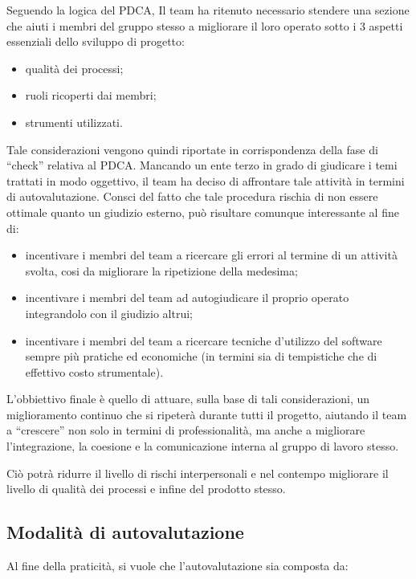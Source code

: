 Seguendo la logica del PDCA, Il team ha ritenuto necessario stendere una sezione che aiuti i membri del gruppo stesso a migliorare il loro operato sotto i 3 aspetti essenziali dello sviluppo di progetto:

\begin{itemize}
	\item qualità dei processi;
	\item ruoli ricoperti dai membri;
	\item strumenti utilizzati.
\end{itemize}

Tale considerazioni vengono quindi riportate in corrispondenza della fase di ``check'' relativa al PDCA. Mancando un ente terzo in grado di giudicare i temi trattati in modo oggettivo, il team ha deciso di affrontare tale attività in termini di autovalutazione. Consci del fatto che tale procedura rischia di non essere ottimale quanto un giudizio esterno, può risultare comunque interessante al fine di:

\begin{itemize}
	\item incentivare i membri del team a ricercare gli errori al termine di un attività svolta, cosi da migliorare la ripetizione della medesima;
	\item incentivare i membri del team ad autogiudicare il proprio operato integrandolo con il giudizio altrui;
	\item incentivare i membri del team a ricercare tecniche d'utilizzo del software sempre più pratiche ed economiche (in termini sia di tempistiche che di effettivo costo strumentale).
\end{itemize}

L'obbiettivo finale è quello di attuare, sulla base di tali considerazioni, un miglioramento continuo che si ripeterà durante tutti il progetto, aiutando il team a ``crescere'' non solo in termini di professionalità, ma anche a migliorare l'integrazione, la coesione e la comunicazione interna al gruppo di lavoro stesso. 

Ciò potrà ridurre il livello di rischi interpersonali e nel contempo migliorare il livello di qualità dei processi e infine del prodotto stesso.

\subsection{Modalità di autovalutazione}

Al fine della praticità, si vuole che l'autovalutazione sia composta da:

